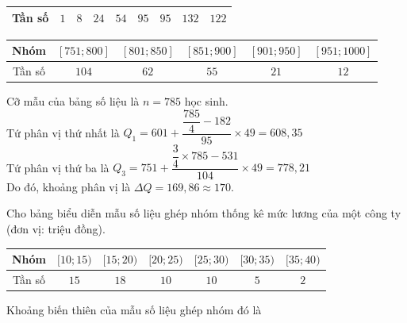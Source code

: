 \begin{bt}
{\begin{center}
\begin{tabular}{|c|c|c|c|c|c|c|c|c|}
		\hline Tần số & $1$ & $8$ & $24$ & $54$ &$95$& $95$ & $132$ & $122$ \\
		\hline
	\end{tabular}
\end{center}
	\begin{center}
	\begin{tabular}{|c|c|c|c|c|c|}
		\hline Nhóm  &	$[751 ; 800]$ &	$[801 ; 850]$& $[851 ; 900]$ & $[901 ; 950]$ &	$[951 ; 1000]$ \\
		\hline Tần số & $104$ &$62$& $55$ & $21$ & $12$ \\
		\hline
	\end{tabular}
\end{center}
Cỡ mẫu của bảng số liệu là $n=785$ học sinh.\\
Tứ phân vị thứ nhất là $Q_1=601+\dfrac{\dfrac{785}{4}-182}{95}\times 49=608{,}35$\\
Tứ phân vị thứ ba là $Q_3=751+\dfrac{\dfrac{3}{4}\times 785-531}{104}\times 49=778{,}21$\\
Do đó, khoảng phân vị là $\Delta Q=169{,}86\approx 170$.

}
\end{bt}

\begin{bt}%

Cho bảng biểu diễn mẫu số liệu ghép nhóm thống kê mức lương của một công ty (đơn vị: triệu đồng).
\begin{center}\begin{tabular}{|c|c|c|c|c|c|c|}
			\hline Nhóm & $[10 ; 15)$ & $[15 ; 20)$ & $[20 ; 25)$ & $[25 ; 30)$ & $[30 ; 35)$ & $[35 ; 40)$  \\
			\hline Tần số & $15$ & $18$ & $10$ &$10$ &$5$ &$2$\\
			\hline
\end{tabular}\end{center}
Khoảng biến thiên của mẫu số liệu ghép nhóm đó là
\end{bt}

